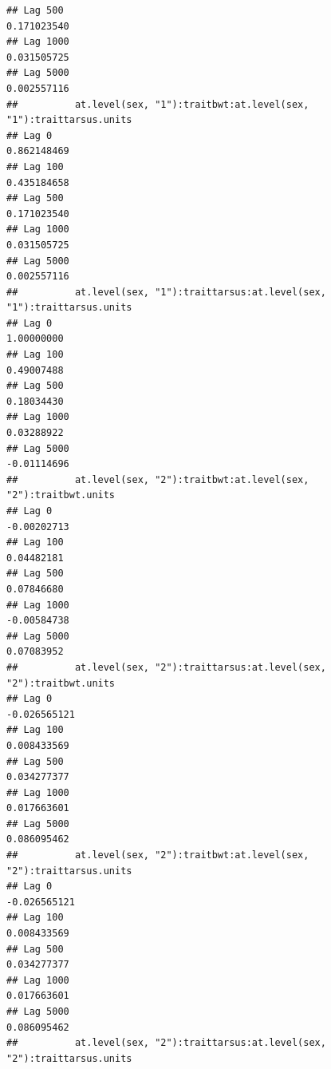 \documentclass[
  12pt,
]{book}
\begin{document}
\begin{verbatim}
## Lag 500                                                       0.171023540
## Lag 1000                                                      0.031505725
## Lag 5000                                                      0.002557116
##          at.level(sex, "1"):traitbwt:at.level(sex, "1"):traittarsus.units
## Lag 0                                                         0.862148469
## Lag 100                                                       0.435184658
## Lag 500                                                       0.171023540
## Lag 1000                                                      0.031505725
## Lag 5000                                                      0.002557116
##          at.level(sex, "1"):traittarsus:at.level(sex, "1"):traittarsus.units
## Lag 0                                                             1.00000000
## Lag 100                                                           0.49007488
## Lag 500                                                           0.18034430
## Lag 1000                                                          0.03288922
## Lag 5000                                                         -0.01114696
##          at.level(sex, "2"):traitbwt:at.level(sex, "2"):traitbwt.units
## Lag 0                                                      -0.00202713
## Lag 100                                                     0.04482181
## Lag 500                                                     0.07846680
## Lag 1000                                                   -0.00584738
## Lag 5000                                                    0.07083952
##          at.level(sex, "2"):traittarsus:at.level(sex, "2"):traitbwt.units
## Lag 0                                                        -0.026565121
## Lag 100                                                       0.008433569
## Lag 500                                                       0.034277377
## Lag 1000                                                      0.017663601
## Lag 5000                                                      0.086095462
##          at.level(sex, "2"):traitbwt:at.level(sex, "2"):traittarsus.units
## Lag 0                                                        -0.026565121
## Lag 100                                                       0.008433569
## Lag 500                                                       0.034277377
## Lag 1000                                                      0.017663601
## Lag 5000                                                      0.086095462
##          at.level(sex, "2"):traittarsus:at.level(sex, "2"):traittarsus.units

\end{verbatim}
\end{document}
